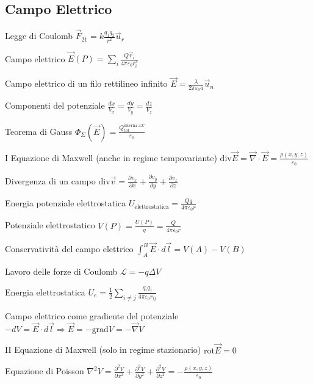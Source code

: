 \documentclass[10pt,a4paper]{article}
\begin{document}
\pagestyle{fancy}

\begin{multicols}{2}

\section*{Campo Elettrico}

Legge di Coulomb $\vec{F}_{21} =k\frac{q_{1} q_{2}}{r^{2}}\vec{u}_{r}$

Campo elettrico $\vec{E} (P)=\sum _{i}\frac{Q\vec{r}_{i}}{4\pi \varepsilon _{0} r^{3}_{i}}$

Campo elettrico di un filo rettilineo infinito $\vec{E} =\frac{\lambda }{2\pi \varepsilon _{0} a}\vec{u}_{n}$

Componenti del potenziale $\frac{dx}{V_{x}} =\frac{dy}{V_{y}} =\frac{dz}{V_{z}}$

Teorema di Gauss $\Phi _{\Sigma } (\vec{E} )=\frac{Q^{\text{interna a} \Sigma }_{\text{tot}}}{\varepsilon _{0}}$

I Equazione di Maxwell (anche in regime tempovariante) $\text{div}\vec{E} =\vec{\nabla } \cdot \vec{E} =\frac{\rho (x,y,z)}{\varepsilon _{0}}$

Divergenza di un campo $\text{div}\vec{v} =\frac{\partial v_{x}}{\partial x} +\frac{\partial v_{y}}{\partial y} +\frac{\partial v_{z}}{\partial z}$

Energia potenziale elettrostatica $U_{\text{elettrostatica}} =\frac{Qq}{4\pi \varepsilon _{0} r}$

Potenziale elettrostatico $V(P)=\frac{U(P)}{q} =\frac{Q}{4\pi \varepsilon _{0} r}$

Conservatività del campo elettrico $\int ^{B}_{A}\vec{E} \cdot d\vec{l} =V(A)-V(B)$

Lavoro delle forze di Coulomb $\mathcal{L} =-q\Delta V$

Energia elettrostatica $U_{e} =\frac{1}{2}\sum _{i\neq j}\frac{q_{i} q_{j}}{4\pi \varepsilon _{0} r_{ij}}$

Campo elettrico come gradiente del potenziale \\$-dV=\vec{E} \cdot d\vec{l} \Rightarrow \vec{E} =-\text{grad} V=-\vec{\nabla } V$

II Equazione di Maxwell (solo in regime stazionario) $\text{rot}\vec{E} =0$

Equazione di Poisson $\nabla ^{2} V=\frac{\partial ^{2} V}{\partial x^{2}} +\frac{\partial ^{2} V}{\partial y^{2}} +\frac{\partial ^{2} V}{\partial z^{2}} =-\frac{\rho (x,y,z)}{\varepsilon _{0}}$


\end{multicols}
\end{document}
